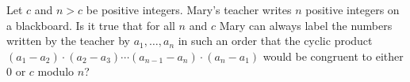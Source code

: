 Let $c$ and $n > c$ be positive integers. Mary's teacher writes $n$ positive integers on a blackboard. Is it true that for all $n$ and $c$ Mary can always label the numbers written by the teacher by $a_1,\ldots, a_n$ in such an order that the cyclic product $(a_1-a_2)\cdot(a_2-a_3)\cdots(a_{n-1}-a_n)\cdot(a_n-a_1)$ would be congruent to either $0$ or $c$ modulo $n$?